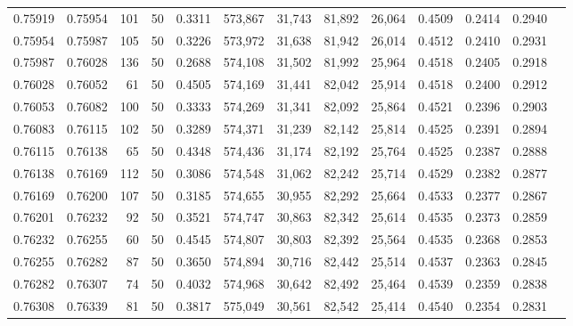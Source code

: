 \begin{tabular}{rrrrrrrrrrrrr}
0.75919 & 0.75954 &   101 &  50 &                                     0.3311 & 573,867 &  31,743 &  81,892 &  26,064 & 0.4509 & 0.2414 & 0.2940 \\
0.75954 & 0.75987 &   105 &  50 &                                     0.3226 & 573,972 &  31,638 &  81,942 &  26,014 & 0.4512 & 0.2410 & 0.2931 \\
0.75987 & 0.76028 &   136 &  50 &                                     0.2688 & 574,108 &  31,502 &  81,992 &  25,964 & 0.4518 & 0.2405 & 0.2918 \\
0.76028 & 0.76052 &    61 &  50 &                                     0.4505 & 574,169 &  31,441 &  82,042 &  25,914 & 0.4518 & 0.2400 & 0.2912 \\
0.76053 & 0.76082 &   100 &  50 &                                     0.3333 & 574,269 &  31,341 &  82,092 &  25,864 & 0.4521 & 0.2396 & 0.2903 \\
0.76083 & 0.76115 &   102 &  50 &                                     0.3289 & 574,371 &  31,239 &  82,142 &  25,814 & 0.4525 & 0.2391 & 0.2894 \\
0.76115 & 0.76138 &    65 &  50 &                                     0.4348 & 574,436 &  31,174 &  82,192 &  25,764 & 0.4525 & 0.2387 & 0.2888 \\
0.76138 & 0.76169 &   112 &  50 &                                     0.3086 & 574,548 &  31,062 &  82,242 &  25,714 & 0.4529 & 0.2382 & 0.2877 \\
0.76169 & 0.76200 &   107 &  50 &                                     0.3185 & 574,655 &  30,955 &  82,292 &  25,664 & 0.4533 & 0.2377 & 0.2867 \\
0.76201 & 0.76232 &    92 &  50 &                                     0.3521 & 574,747 &  30,863 &  82,342 &  25,614 & 0.4535 & 0.2373 & 0.2859 \\
0.76232 & 0.76255 &    60 &  50 &                                     0.4545 & 574,807 &  30,803 &  82,392 &  25,564 & 0.4535 & 0.2368 & 0.2853 \\
0.76255 & 0.76282 &    87 &  50 &                                     0.3650 & 574,894 &  30,716 &  82,442 &  25,514 & 0.4537 & 0.2363 & 0.2845 \\
0.76282 & 0.76307 &    74 &  50 &                                     0.4032 & 574,968 &  30,642 &  82,492 &  25,464 & 0.4539 & 0.2359 & 0.2838 \\
0.76308 & 0.76339 &    81 &  50 &                                     0.3817 & 575,049 &  30,561 &  82,542 &  25,414 & 0.4540 & 0.2354 & 0.2831 \\

\end{tabular}
